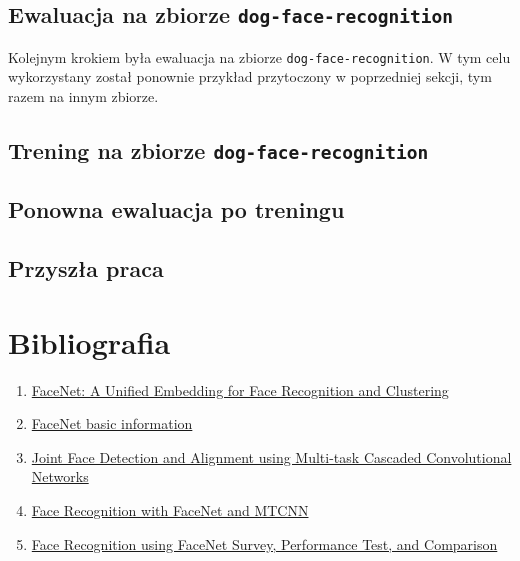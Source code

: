 \documentclass[11pt]{article}
\begin{document}
    \subsection{Ewaluacja na zbiorze \texttt{dog-face-recognition}}

    Kolejnym krokiem była ewaluacja na zbiorze \texttt{dog-face-recognition}. W tym celu wykorzystany został ponownie przykład przytoczony w poprzedniej sekcji, tym razem na innym zbiorze.

    \subsection{Trening na zbiorze \texttt{dog-face-recognition}}

    \subsection{Ponowna ewaluacja po treningu}

    \subsection{Przyszła praca}
    
    \section{Bibliografia}
    \begin{enumerate}
        \item \href{https://arxiv.org/abs/1503.03832}{FaceNet: A Unified Embedding for Face Recognition and Clustering}
        \item \href{https://en.wikipedia.org/wiki/FaceNet}{FaceNet basic information}
        \item \href{https://arxiv.org/abs/1604.02878}{Joint Face Detection and Alignment using Multi-task Cascaded Convolutional Networks}
        \item \href{https://medium.com/@culuma/face-recognition-with-facenet-and-mtcnn-11e77240adb6}{Face Recognition with FaceNet and MTCNN}
        \item \href{https://www.researchgate.net/profile/De-Rosal-Ignatius-Moses-Setiadi/publication/346417651_Study_Analysis_of_Human_Face_Recognition_using_Principal_Component_Analysis/links/605a0218458515e83467c633/Study-Analysis-of-Human-Face-Recognition-using-Principal-Component-Analysis.pdf}{Face Recognition using FaceNet Survey, Performance Test, and Comparison}
    \end{enumerate}
\end{document}
